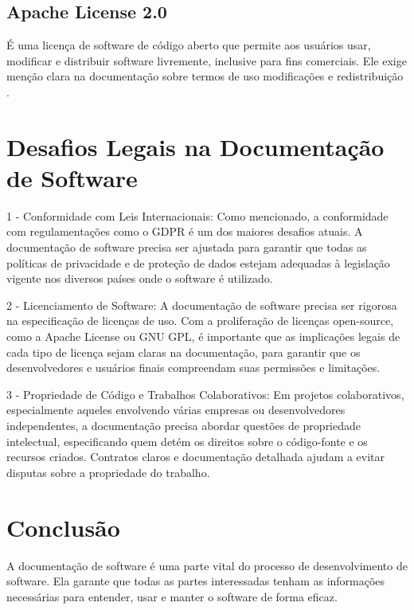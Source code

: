 \documentclass[12pt,oneside,a4paper,article]{abntex2}
\begin{document}
\subsection{Apache License 2.0}
É uma licença de software de código aberto que permite aos usuários usar, modificar e distribuir software livremente, inclusive para fins comerciais. Ele exige menção clara na documentação sobre termos de uso modificações e redistribuição \cite{Apache2}.


\section{Desafios Legais na Documentação de Software}
1 - Conformidade com Leis Internacionais: Como mencionado, a conformidade com regulamentações como o GDPR é um dos maiores desafios atuais. A documentação de software precisa ser ajustada para garantir que todas as políticas de privacidade e de proteção de dados estejam adequadas à legislação vigente nos diversos países onde o software é utilizado.

2 - Licenciamento de Software: A documentação de software precisa ser rigorosa na especificação de licenças de uso. Com a proliferação de licenças open-source, como a Apache License ou GNU GPL, é importante que as implicações legais de cada tipo de licença sejam claras na documentação, para garantir que os desenvolvedores e usuários finais compreendam suas permissões e limitações.

3 - Propriedade de Código e Trabalhos Colaborativos: Em projetos colaborativos, especialmente aqueles envolvendo várias empresas ou desenvolvedores independentes, a documentação precisa abordar questões de propriedade intelectual, especificando quem detém os direitos sobre o código-fonte e os recursos criados. Contratos claros e documentação detalhada ajudam a evitar disputas sobre a propriedade do trabalho.

\section{Conclusão}
A documentação de software é uma parte vital do processo de desenvolvimento de software.
Ela garante que todas as partes interessadas tenham as informações necessárias para entender,
usar e manter o software de forma eficaz.


\newpage

\end{document}

